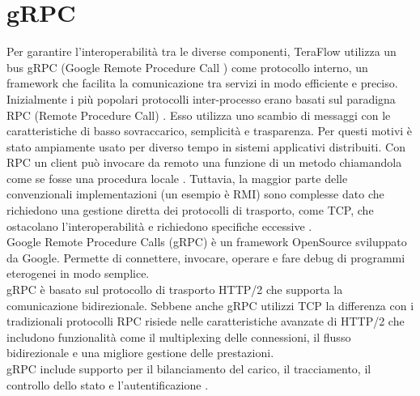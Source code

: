 \section{gRPC} \label{grpc}
Per garantire l'interoperabilità tra le diverse componenti, TeraFlow utilizza un bus gRPC (Google Remote Procedure Call \cite{grpc}) come protocollo interno, 
un framework che facilita la comunicazione tra servizi in modo efficiente e preciso. 
\\Inizialmente i più popolari protocolli inter-processo erano basati sul paradigna RPC (Remote Procedure Call) \cite{librogrpc}.
Esso utilizza uno scambio di messaggi con le caratteristiche di basso sovraccarico, semplicità e trasparenza.
Per questi motivi è stato ampiamente usato per diverso tempo in sistemi applicativi distribuiti.
Con RPC un client può invocare da remoto una funzione di un metodo chiamandola come se fosse una procedura locale \cite{grpcArt2}.
Tuttavia, la maggior parte delle convenzionali implementazioni (un esempio è RMI) sono complesse dato che richiedono una gestione diretta dei protocolli di trasporto, come TCP, che ostacolano l'interoperabilità e richiedono specifiche eccessive \cite{librogrpc}.
\\Google Remote Procedure Calls (gRPC\cite{grpc}) è un framework OpenSource sviluppato da Google. Permette di
connettere, invocare, operare e fare debug di programmi eterogenei in modo semplice.
\\gRPC è basato sul protocollo di trasporto HTTP/2 che supporta la comunicazione bidirezionale. 
Sebbene anche gRPC utilizzi TCP la differenza con i tradizionali protocolli RPC risiede nelle caratteristiche avanzate di HTTP/2 che includono funzionalità come il multiplexing delle connessioni, il flusso bidirezionale 
e una migliore gestione delle prestazioni. 
\\gRPC include supporto per il bilanciamento del carico, il tracciamento, il controllo dello stato e l'autentificazione\cite{grpcArt3} \cite{grpcArt1}.
